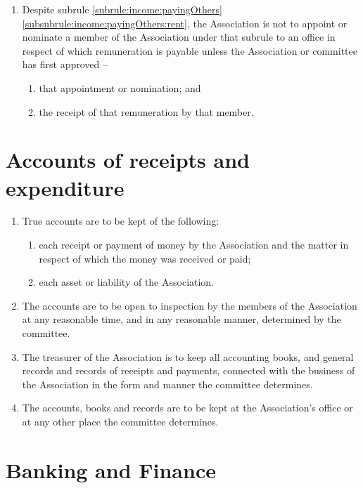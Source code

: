 \documentclass[a4paper,11pt]{article}
\begin{document}
\begin{enumerate}
	\item Despite subrule \ref{subrule:income:payingOthers}\ref{subsubrule:income:payingOthers:rent}, the Association is not to appoint or nominate a member of the Association under that subrule to an office in respect of which remuneration is payable unless the Association or committee has first approved --
	\begin{enumerate}
		\item that appointment or nomination; and
		\item the receipt of that remuneration by that member.
	\end{enumerate}

\end{enumerate}

\section{Accounts of receipts and expenditure}
\label{rule:accounts}

\begin{enumerate}
	\item True accounts are to be kept of the following:
	\begin{enumerate}
		\item each receipt or payment of money by the Association and the matter in respect of which the money was received or paid;
		\item each asset or liability of the Association.
	\end{enumerate}
	
	\item The accounts are to be open to inspection by the members of the Association at any reasonable time, and in any reasonable manner, determined by the committee.
	\item The treasurer of the Association is to keep all accounting books, and general records and records of receipts and payments, connected with the business of the Association in the form and manner the committee determines.
	\item The accounts, books and records are to be kept at the Association's office or at any other place the committee determines.
\end{enumerate}

\section{Banking and Finance}
\label{rule:banking}
\end{document}
